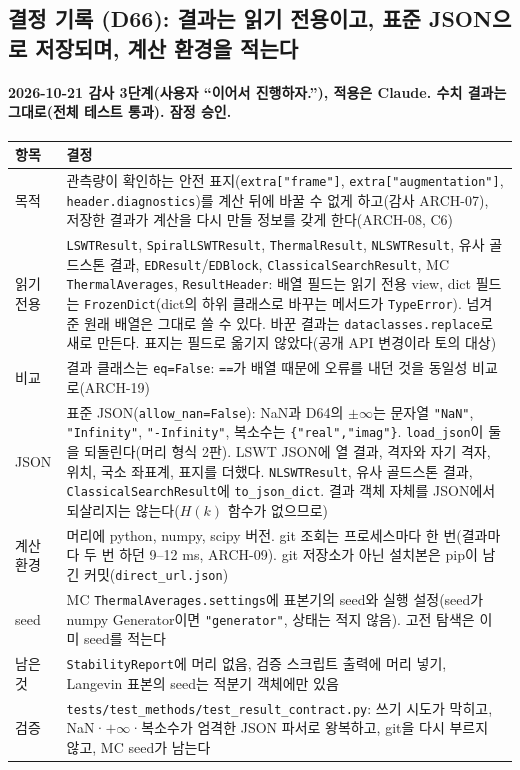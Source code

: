 \subsection{결정 기록 (D66): 결과는 읽기 전용이고, 표준 JSON으로 저장되며, 계산 환경을 적는다}\label{decisions-d66-result-contract}
\begingroup%
  \framesubtitle{2026-10-21 감사 3단계(사용자 ``이어서 진행하자.''), 적용은 Claude. 수치 결과는 그대로(전체 테스트 통과). 잠정 승인.}
  \small\renewcommand{\arraystretch}{1.12}
  \begin{tabularx}{\textwidth}{@{}P{3.0cm}Y@{}}
    \toprule
    항목 & 결정 \\
    \midrule
    목적 & 관측량이 확인하는 안전 표지(\texttt{extra["frame"]}, \texttt{extra["augmentation"]}, \texttt{header.diagnostics})를 계산 뒤에 바꿀 수 없게 하고(감사 ARCH-07), 저장한 결과가 계산을 다시 만들 정보를 갖게 한다(ARCH-08, C6) \\
    읽기 전용 & \texttt{LSWTResult}, \texttt{SpiralLSWTResult}, \texttt{ThermalResult}, \texttt{NLSWTResult}, 유사 골드스톤 결과, \texttt{EDResult}/\texttt{EDBlock}, \texttt{ClassicalSearchResult}, MC \texttt{ThermalAverages}, \texttt{ResultHeader}: 배열 필드는 읽기 전용 view, dict 필드는 \texttt{FrozenDict}(dict의 하위 클래스로 바꾸는 메서드가 \texttt{TypeError}). 넘겨 준 원래 배열은 그대로 쓸 수 있다. 바꾼 결과는 \texttt{dataclasses.replace}로 새로 만든다. 표지는 필드로 옮기지 않았다(공개 API 변경이라 토의 대상) \\
    비교 & 결과 클래스는 \texttt{eq=False}: \texttt{==}가 배열 때문에 오류를 내던 것을 동일성 비교로(ARCH-19) \\
    JSON & 표준 JSON(\texttt{allow\_nan=False}): NaN과 D64의 $\pm\infty$는 문자열 \texttt{"NaN"}, \texttt{"Infinity"}, \texttt{"-Infinity"}, 복소수는 \texttt{\{"real","imag"\}}. \texttt{load\_json}이 둘을 되돌린다(머리 형식 2판). LSWT JSON에 열 결과, 격자와 자기 격자, 위치, 국소 좌표계, 표지를 더했다. \texttt{NLSWTResult}, 유사 골드스톤 결과, \texttt{ClassicalSearchResult}에 \texttt{to\_json\_dict}. 결과 객체 자체를 JSON에서 되살리지는 않는다($H(k)$ 함수가 없으므로) \\
    계산 환경 & 머리에 python, numpy, scipy 버전. git 조회는 프로세스마다 한 번(결과마다 두 번 하던 9--12 ms, ARCH-09). git 저장소가 아닌 설치본은 pip이 남긴 커밋(\texttt{direct\_url.json}) \\
    seed & MC \texttt{ThermalAverages.settings}에 표본기의 seed와 실행 설정(seed가 numpy Generator이면 \texttt{"generator"}, 상태는 적지 않음). 고전 탐색은 이미 seed를 적는다 \\
    남은 것 & \texttt{StabilityReport}에 머리 없음, 검증 스크립트 출력에 머리 넣기, Langevin 표본의 seed는 적분기 객체에만 있음 \\
    검증 & \texttt{tests/test\_methods/test\_result\_contract.py}: 쓰기 시도가 막히고, NaN·$+\infty$·복소수가 엄격한 JSON 파서로 왕복하고, git을 다시 부르지 않고, MC seed가 남는다 \\
    \bottomrule
  \end{tabularx}
\endgroup

